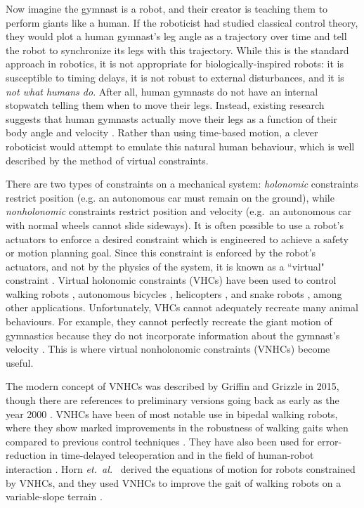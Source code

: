 \documentclass[letterpaper,12pt]{article}
\begin{document}
Now imagine the gymnast is a robot, and their creator is teaching them to
perform giants like a human.
If the roboticist had studied classical control theory, they would plot a human
gymnast's leg angle as a trajectory over time and tell the robot to synchronize
its legs with this trajectory.
While this is the standard approach in robotics, it is not appropriate for
biologically-inspired robots: it is susceptible to timing delays, it is not
robust to external disturbances, and it is \textit{not what humans do}.
After all, human gymnasts do not have an internal stopwatch telling them when to
move their legs.
Instead, existing research suggests that human gymnasts actually move their legs
as a function of their body angle and velocity
\cite{pendulum_length_giant_gymnastics}. 
Rather than using time-based motion, a clever roboticist would attempt to
emulate this natural human behaviour, which is well described by the method
of virtual constraints.

There are two types of constraints on a mechanical system:
\textit{holonomic} constraints restrict position (e.g. an autonomous car must
remain on the ground),
while \textit{nonholonomic} constraints restrict position and
velocity (e.g.~an autonomous car with normal wheels cannot slide sideways).
It is often possible to use a robot's actuators to enforce a desired constraint
which is engineered to achieve a safety or motion planning goal.
Since this constraint is enforced by the robot's actuators, and not by the
physics of the system, it is known as a ``virtual" constraint
\cite{vhcs_for_el_systems}.
Virtual holonomic constraints (VHCs) have been used to control walking robots
\cite{stable_walking}, autonomous bicycles \cite{bicycle},
helicopters \cite{helicopter}, and snake robots \cite{snake_robot},
among other applications.
Unfortunately, VHCs cannot adequately recreate many animal behaviours.
For example, they cannot perfectly recreate the giant motion of gymnastics 
because they do not incorporate information about the gymnast's velocity
\cite{xingbo_thesis}.
This is where virtual nonholonomic constraints (VNHCs) become useful.

The modern concept of VNHCs was described by
Griffin and Grizzle \cite{nhvc_dynamic_walking} in 2015, though there are
references to preliminary versions going back as early as the year 2000
\cite{vnhc_human_robot_coop}.
VNHCs have been of most notable use in bipedal walking robots,
where they show marked improvements in the robustness of walking gaits
when compared to previous control techniques
\cite{nhvc_gait_optimization,output_nhvc_bipedal_control}.
They have also been used for error-reduction in time-delayed teleoperation
\cite{vnhc_time_delay_teleop} and in the field of human-robot interaction
\cite{psd_based_vnhc_redundant_manipulator,haptic_vnhc}.
Horn \textit{et.~al.}~\cite{hybrid_zero_dynamics_bipedal_nhvcs} derived the 
equations of motion for robots constrained by VNHCs, and they used VNHCs to
improve the gait of walking robots on a variable-slope terrain
\cite{nhvc_incline_walking}.
\end{document}
